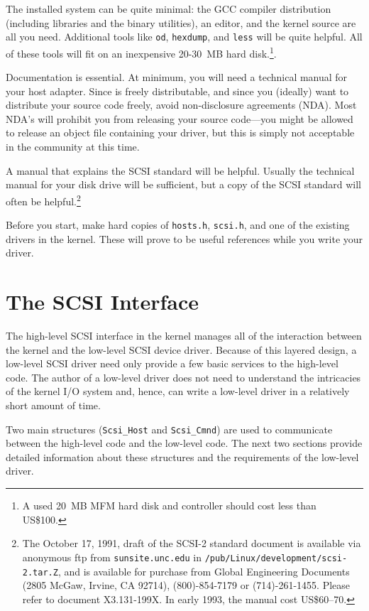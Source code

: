 The installed \Linux{} system can be quite minimal: the GCC compiler
distribution (including libraries and the binary utilities), an editor, and
the kernel source are all you need.  Additional tools like \verb|od|,
\verb|hexdump|, and \verb|less| will be quite helpful.  All of these tools
will fit on an inexpensive 20-30~MB hard disk.\footnote{A used 20~MB MFM
  hard disk and controller should cost less than US\$100.}.

Documentation is essential.  At minimum, you will need a technical manual
for your host adapter.  Since \Linux{} is freely distributable, and since
you (ideally) want to distribute your source code freely, avoid
non-disclosure agreements (NDA)\@.  Most NDA's will prohibit you from
releasing your source code---you might be allowed to release an object file
containing your driver, but this is simply not acceptable in the \Linux{}
community at this time.

A manual that explains the SCSI standard will be helpful.  Usually the
technical manual for your disk drive will be sufficient, but a copy of the
SCSI standard will often be helpful.\footnote{The October 17, 1991, draft
  of the SCSI-2 standard document is available via anonymous ftp from
  \verb|sunsite.unc.edu| in \verb|/pub/Linux/development/scsi-2.tar.Z|, and
  is available for purchase from Global Engineering Documents (2805 McGaw,
  Irvine, CA 92714), (800)-854-7179 or (714)-261-1455.  Please refer to
  document X3.131-199X\@.  In early 1993, the manual cost US\$60--70.}


Before you start, make hard copies of \verb|hosts.h|, \verb|scsi.h|, and
one of the existing drivers in the \Linux{} kernel.  These will prove to be
useful references while you write your driver.



\section{The \Linux{} SCSI Interface}

The high-level SCSI interface in the \Linux{} kernel manages all of the
interaction between the kernel and the low-level SCSI device driver.
Because of this layered design, a low-level SCSI driver need only provide a
few basic services to the high-level code.  The author of a low-level
driver does not need to understand the intricacies of the kernel I/O system
and, hence, can write a low-level driver in a relatively short amount of
time.

Two main structures (\verb|Scsi_Host| and \verb|Scsi_Cmnd|) are used to
communicate between the high-level code and the low-level code.  The next
two sections provide detailed information about these structures and the
requirements of the low-level driver.



